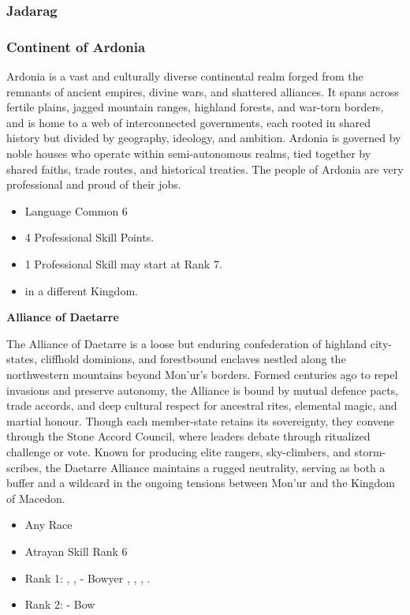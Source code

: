\documentclass[12pt]{article}
\newcommand{\subsubsubsection}[1]{%
  \vspace{1em} %
  \noindent\textbf{\small #1}\par
  \vspace{0.5em} %
}
\begin{document}
\subsubsection{Jadarag}
\subsubsection{Continent of Ardonia}
Ardonia is a vast and culturally diverse continental realm forged from the remnants of ancient empires, divine wars, and shattered alliances. It spans across fertile plains, jagged mountain ranges, highland forests, and war-torn borders, and is home to a web of interconnected governments, each rooted in shared history but divided by geography, ideology, and ambition.
Ardonia is governed by noble houses who operate within semi-autonomous realms, tied together by shared faiths, trade routes, and historical treaties. The people of Ardonia are very professional and proud of their jobs.
\begin{itemize}
\item Language Common 6
\item 4 Professional Skill Points.
\item 1 Professional Skill may start at Rank 7.
\item {} in a different Kingdom.
\end{itemize}
\subsubsubsection{Alliance of Daetarre}
The Alliance of Daetarre is a loose but enduring confederation of highland city-states, cliffhold dominions, and forestbound enclaves nestled along the northwestern mountains beyond Mon'ur's borders. Formed centuries ago to repel invasions and preserve autonomy, the Alliance is bound by mutual defence pacts, trade accords, and deep cultural respect for ancestral rites, elemental magic, and martial honour. Though each member-state retains its sovereignty, they convene through the Stone Accord Council, where leaders debate through ritualized challenge or vote. Known for producing elite rangers, sky-climbers, and storm-scribes, the Daetarre Alliance maintains a rugged neutrality, serving as both a buffer and a wildcard in the ongoing tensions between Mon'ur and the Kingdom of Macedon.
\begin{itemize}
\item Any Race
\item Atrayan Skill Rank 6
\item Rank 1: , ,  - Bowyer , , , .
\item Rank 2:  - Bow
\end{itemize}
\end{document}
